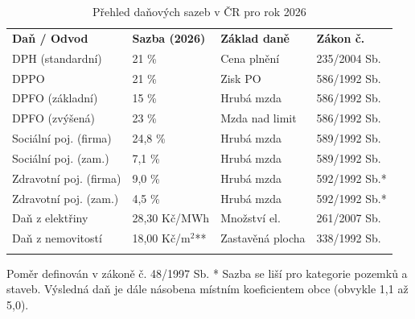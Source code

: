 \begin{table}[ht] \centering \setlength{\tabcolsep}{8pt} \small

    \begin{tabular}{llll}
        \toprule
        \addlinespace
        \textbf{Daň / Odvod} & \textbf{Sazba (2026)} & \textbf{Základ daně} & \textbf{Zákon č.} \\
        \addlinespace
        \midrule
        
        \addlinespace
        DPH (standardní) & 21 \% & Cena plnění & 235/2004 Sb. \\
        DPPO & 21 \% & Zisk PO & 586/1992 Sb. \\
        DPFO (základní) & 15 \% & Hrubá mzda & 586/1992 Sb. \\
        DPFO (zvýšená) & 23 \% & Mzda nad limit & 586/1992 Sb. \\
        
        \addlinespace
        
        Sociální poj. (firma) & 24,8 \% & Hrubá mzda & 589/1992 Sb. \\
        Sociální poj. (zam.) & 7,1 \% & Hrubá mzda & 589/1992 Sb. \\
        Zdravotní poj. (firma) & 9,0 \% & Hrubá mzda & 592/1992 Sb.* \\
        Zdravotní poj. (zam.) & 4,5 \% & Hrubá mzda & 592/1992 Sb.* \\
        
        \addlinespace
        
        Daň z elektřiny & 28,30 Kč/MWh & Množství el. & 261/2007 Sb. \\
        Daň z nemovitostí & 18,00 Kč/m$^2$** & Zastavěná plocha & 338/1992 Sb. \\
        
        \addlinespace
        \bottomrule
    \end{tabular}

    \vspace{2mm}
    \begin{minipage}{0.93\textwidth}
        \footnotesize * Poměr definován v zákoně č. 48/1997 Sb.
        \footnotesize ** Sazba se liší pro kategorie pozemků a staveb. Výsledná daň je dále násobena místním koeficientem obce (obvykle 1,1 až 5,0).
    \end{minipage}
    
    \caption{Přehled daňových sazeb v ČR pro rok 2026}
    \label{tab:cz_dane_sazby}
\end{table}


